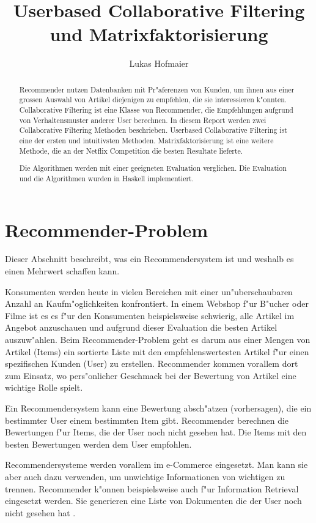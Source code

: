 \documentclass[a4paper, 12pt]{article}
\author{Lukas Hofmaier}
\title{Userbased Collaborative Filtering und Matrixfaktorisierung}
\begin{document}
\lstset{basicstyle=\small,
language=Haskell,
stringstyle=ttfamiliy
}

\maketitle
\newpage
\tableofcontents
\newpage
\begin{abstract}
Recommender nutzen Datenbanken mit Pr"aferenzen von Kunden, um ihnen aus einer grossen Auswahl von Artikel diejenigen zu empfehlen, die sie interessieren k"onnten. Collaborative Filtering ist eine Klasse von Recommender, die Empfehlungen aufgrund von Verhaltensmuster anderer User berechnen.
In diesem Report werden zwei Collaborative Filtering Methoden beschrieben. Userbased Collaborative Filtering ist eine der ersten und intuitivsten Methoden. Matrixfaktorisierung ist eine weitere Methode, die an der Netflix Competition die besten Resultate lieferte.

Die Algorithmen werden mit einer geeigneten Evaluation verglichen. Die Evaluation und die Algorithmen wurden in Haskell implementiert.

\end{abstract}

\section{Recommender-Problem}
\label{sec:problem}
Dieser Abschnitt beschreibt, was ein Recommendersystem ist und weshalb es einen Mehrwert schaffen kann.

Konsumenten werden heute in vielen Bereichen mit einer un"uberschaubaren Anzahl an Kaufm"oglichkeiten konfrontiert. In einem Webshop f"ur B"ucher oder Filme ist es es f"ur den Konsumenten beispielsweise schwierig, alle Artikel im Angebot anzuschauen und aufgrund dieser Evaluation die besten Artikel auszuw"ahlen. Beim Recommender-Problem geht es darum aus einer Mengen von Artikel (Items) ein sortierte Liste mit den empfehlenswertesten Artikel f"ur einen spezifischen Kunden (User) zu erstellen. Recommender kommen vorallem dort zum Einsatz, wo pers"onlicher Geschmack bei der Bewertung von Artikel eine wichtige Rolle spielt.

Ein Recommendersystem kann eine Bewertung absch"atzen (vorhersagen), die ein bestimmter User einem bestimmten Item gibt. Recommender berechnen die Bewertungen f"ur Items, die der User noch nicht gesehen hat. Die Items mit den besten Bewertungen werden dem User empfohlen.

Recommendersysteme werden vorallem im e-Commerce eingesetzt. Man kann sie aber auch dazu verwenden, um unwichtige Informationen von wichtigen zu trennen. Recommender k"onnen beispielsweise auch f"ur Information Retrieval eingesetzt werden. Sie generieren eine Liste von Dokumenten die der User noch nicht gesehen hat \cite{herlocker00}.
\end{document}
